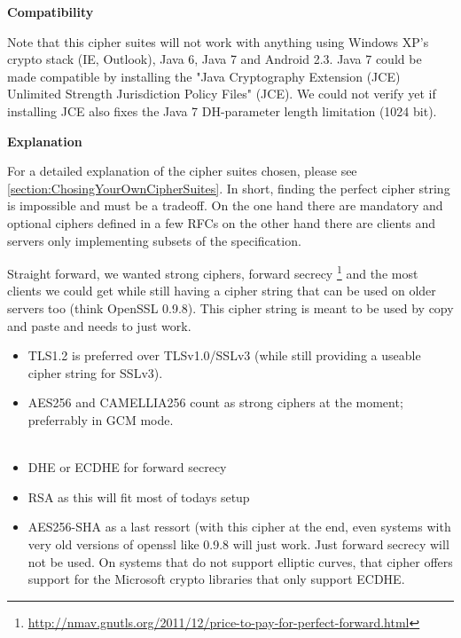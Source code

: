 \textbf{Compatibility}

Note that this cipher suites will not work with anything using Windows XP's
crypto stack (IE, Outlook), Java 6, Java 7 and Android 2.3. Java 7 could be
made compatible by installing the "Java Cryptography Extension (JCE) Unlimited
Strength Jurisdiction Policy Files" (JCE). We could not verify yet if
installing JCE also fixes the Java 7 DH-parameter length limitation (1024 bit). 

\textbf{Explanation}

For a detailed explanation of the cipher suites chosen, please see
\ref{section:ChosingYourOwnCipherSuites}. In short, finding the perfect cipher
string is impossible and must be a tradeoff. On the one hand
there are mandatory and optional ciphers defined in a few RFCs on the other hand
there are clients and servers only implementing subsets of the specification.

Straight forward, we wanted strong ciphers, forward secrecy
\footnote{\url{http://nmav.gnutls.org/2011/12/price-to-pay-for-perfect-forward.html}}
and the most clients we could get while still having a cipher string that can be
used on older servers too (think OpenSSL 0.9.8). This cipher string is meant to be used
by copy and paste and needs to just work.

\begin{itemize}
\item TLS1.2 is preferred over TLSv1.0/SSLv3 (while still providing a useable cipher
      string for SSLv3).
\item AES256 and CAMELLIA256 count as strong ciphers at the moment; preferrably in
      GCM mode.\\
       \\
\item DHE or ECDHE for forward secrecy
\item RSA as this will fit most of todays setup
\item AES256-SHA as a last ressort (with this cipher at the end, even systems with
      very old versions of openssl like 0.9.8 will just work. Just forward secrecy
      will not be used. On systems that do not support elliptic curves, that cipher
      offers support for the Microsoft crypto libraries that only support ECDHE.
\end{itemize}





